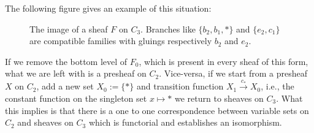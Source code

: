     The following figure gives an example of this situation:
    
  \begin{figure}[h]
  	\centering
  	\caption{The image of a sheaf $F$ on $C_3$. 
  	Branches like $\{b_2,b_1,*\}$ and $\{e_2,c_1\}$ are compatible families with gluings respectively $b_2$ and $e_2$.}
  \end{figure}
 \newpage
 \begin{remark}
	If we remove the bottom level of $F_0$, which is present in every sheaf of this form, what we are left with is a presheaf on $C_2$.
 	\newline
 	Vice-versa, if we start from a presheaf $X$ on $C_2$, add a new set $X_0 := \{ * \} $ and transition function $X_1 \xrightarrow{c_*} X_0$, i.e., the constant function on the singleton set $x \mapsto *$ we return to sheaves on $C_3$. \newline
 	What this implies is that there is a one to one correspondence between variable sets on $C_2$ and sheaves on $C_3$ which is functorial and establishes an isomorphism.
 \end{remark}
 

